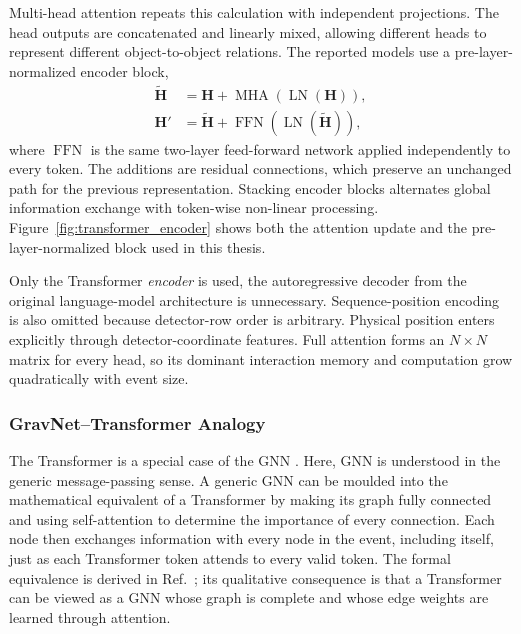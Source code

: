 Multi-head attention repeats this calculation with independent projections.
The head outputs are concatenated and linearly mixed, allowing different
heads to represent different object-to-object relations. The reported models
use a pre-layer-normalized encoder block,
\begin{align}
    \widetilde{\mathbf{H}}
    &=
    \mathbf{H}
    +
    \operatorname{MHA}\!\left(\operatorname{LN}(\mathbf{H})\right),
    \label{eq:preln_attention}\\
    \mathbf{H}'
    &=
    \widetilde{\mathbf{H}}
    +
    \operatorname{FFN}\!\left(
        \operatorname{LN}(\widetilde{\mathbf{H}})
    \right),
    \label{eq:preln_ffn}
\end{align}
where \(\operatorname{FFN}\) is the same two-layer feed-forward network
applied independently to every token. The additions are residual connections,
which preserve an unchanged path for the previous representation. Stacking
encoder blocks alternates global information exchange with token-wise
non-linear processing. Figure~\ref{fig:transformer_encoder} shows both the
attention update and the pre-layer-normalized block used in this thesis.



Only the Transformer \textit{encoder} is used, the autoregressive decoder from the
original language-model architecture \cite{vaswani2017attention} is unnecessary. Sequence-position
encoding is also omitted because detector-row order is arbitrary. Physical
position enters explicitly through detector-coordinate features. %
Full attention forms an
\(N\times N\) matrix for every head, so its dominant interaction memory and
computation grow quadratically with event size.













\subsubsection{GravNet--Transformer Analogy}
\label{sec:gravnet_transformer_comparison}

The Transformer is a special case of the GNN \cite{joshi2025transformersgnn}. Here, GNN is understood in the
generic message-passing sense. A generic
GNN can be moulded into the mathematical equivalent of a Transformer by making
its graph fully connected and using self-attention to determine the importance
of every connection. Each node then exchanges information with every node in
the event, including itself, just as each Transformer token attends to every
valid token. The formal equivalence is derived in
Ref.~\cite{joshi2025transformersgnn}; its qualitative consequence is that a
Transformer can be viewed as a GNN whose graph is complete and whose edge
weights are learned through attention.


